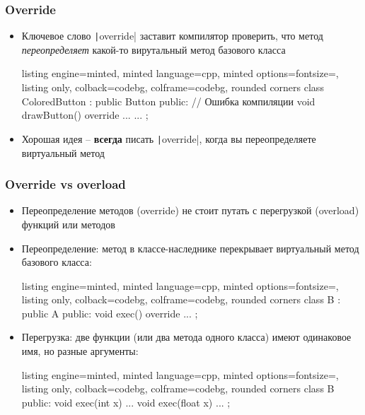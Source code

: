 \documentclass[10pt]{beamer}
\begin{document}
\begin{frame}[fragile]
\frametitle{Override}
\begin{itemize}
\item Ключевое слово \texttt|override| заставит компилятор проверить, что метод \textit{переопределяет} какой-то вирутальный метод базового класса
\pause
{}
\begin{tcblisting}{listing engine=minted, minted language=cpp, minted options={fontsize=\scriptsize}, listing only, colback=codebg, colframe=codebg, rounded corners}
class ColoredButton : public Button {
public:
  // Ошибка компиляции
  void drawButton() override { ... }
  ...
};
\end{tcblisting}
\pause
{}
\item Хорошая идея -- \textbf{всегда} писать \texttt|override|, когда вы переопределяете виртуальный метод
\end{itemize}
\end{frame}

\begin{frame}[fragile]
\frametitle{Override vs overload}
\begin{itemize}
\item Переопределение методов (override) не стоит путать с перегрузкой (overload) функций или методов
\pause
\item Переопределение: метод в классе-наследнике перекрывает виртуальный метод базового класса:
\begin{tcblisting}{listing engine=minted, minted language=cpp, minted options={fontsize=\scriptsize}, listing only, colback=codebg, colframe=codebg, rounded corners}
class B : public A {
public:
  void exec() override { ... }
};
\end{tcblisting}
\pause
{}
\item Перегрузка: две функции (или два метода одного класса) имеют одинаковое имя, но разные аргументы:
\begin{tcblisting}{listing engine=minted, minted language=cpp, minted options={fontsize=\scriptsize}, listing only, colback=codebg, colframe=codebg, rounded corners}
class B {
public:
  void exec(int x) { ... }
  void exec(float x) { ... }
};
\end{tcblisting}
\end{itemize}
\end{frame}
\end{document}
